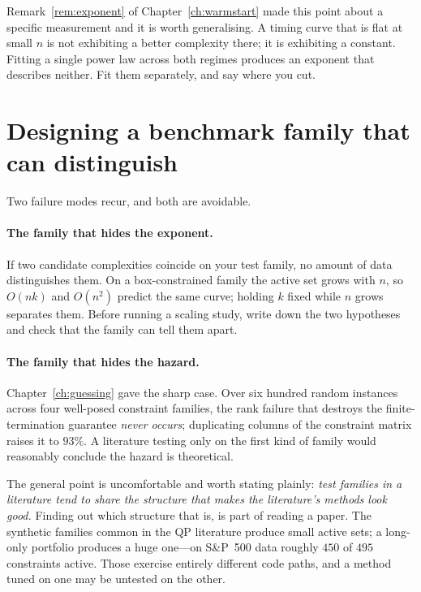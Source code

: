 \begin{remark}
Remark~\ref{rem:exponent} of Chapter~\ref{ch:warmstart} made this point about a specific
measurement and it is worth generalising. A timing curve that is flat at small $n$ is
not exhibiting a better complexity there; it is exhibiting a constant. Fitting a single
power law across both regimes produces an exponent that describes neither. Fit them
separately, and say where you cut.
\end{remark}

\section{Designing a benchmark family that can distinguish}

Two failure modes recur, and both are avoidable.

\paragraph{The family that hides the exponent.} If two candidate complexities coincide
on your test family, no amount of data distinguishes them. On a box-constrained family
the active set grows with $n$, so $O(nk)$ and $O(n^2)$ predict the same curve; holding
$k$ fixed while $n$ grows separates them. Before running a scaling study, write down the
two hypotheses and check that the family can tell them apart.

\paragraph{The family that hides the hazard.} Chapter~\ref{ch:guessing} gave the sharp
case. Over six hundred random instances across four well-posed constraint families, the
rank failure that destroys the finite-termination guarantee \emph{never occurs};
duplicating columns of the constraint matrix raises it to $93\%$. A literature testing
only on the first kind of family would reasonably conclude the hazard is theoretical.

The general point is uncomfortable and worth stating plainly: \emph{test families in a
literature tend to share the structure that makes the literature's methods look good.}
Finding out which structure that is, is part of reading a paper. The synthetic families
common in the QP literature produce small active sets; a long-only portfolio produces a
huge one---on S\&P~500 data roughly $450$ of $495$ constraints active. Those exercise
entirely different code paths, and a method tuned on one may be untested on the other.

